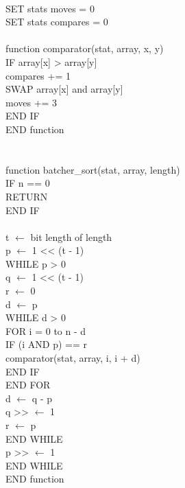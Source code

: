 \documentclass[12pt]{article}
\begin{document}
\\
SET stats moves = 0 \\
SET stats compares = 0 \\
\\
function comparator(stat, array, x, y) \\
\indent IF array[x] > array[y] \\
\indent \indent compares += 1 \\
\indent \indent SWAP array[x] and array[y] \\
\indent \indent moves += 3 \\
\indent END IF \\
END function \\
\\
\\
function batcher\_sort(stat, array, length) \\
\indent IF n == 0 \\
\indent \indent RETURN \\
\indent END IF \\
\\
\indent t $\leftarrow$ bit length of length \\
\indent p $\leftarrow$ 1 << (t - 1) \\
\indent WHILE p > 0 \\
\indent \indent q $\leftarrow$ 1 << (t - 1) \\
\indent \indent r $\leftarrow$ 0 \\
\indent \indent d $\leftarrow$ p \\
\indent \indent WHILE d > 0 \\
\indent \indent \indent FOR i = 0 to n - d \\
\indent \indent \indent \indent IF (i AND p) == r \\
\indent \indent \indent \indent \indent comparator(stat, array, i, i + d) \\
\indent \indent \indent \indent END IF \\
\indent \indent \indent END FOR \\
\indent \indent \indent d $\leftarrow$ q - p \\
\indent \indent \indent q >> $\leftarrow$ 1 \\
\indent \indent \indent r $\leftarrow$ p \\
\indent \indent END WHILE \\
\indent \indent p >> $\leftarrow$ 1 \\
\indent END WHILE \\
END function \\
\end{document}
